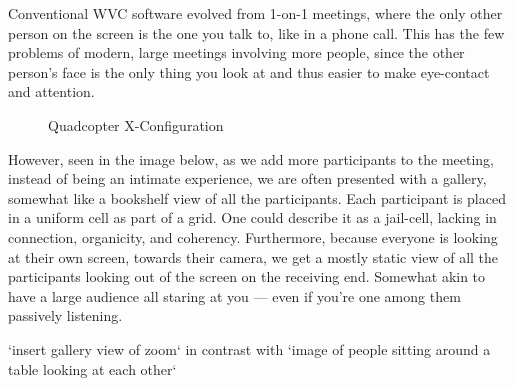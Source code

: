 \documentclass[11pt,letterpaper]{article}
\begin{document}
Conventional WVC software evolved from 1-on-1 meetings, where the only other person on the screen is the one you talk to, like in a phone call. This has the few problems of modern, large meetings involving more people, since the other person’s face is the only thing you look at and thus easier to make eye-contact and attention. 

\begin{figure}[H]
	\centering
	\caption{Quadcopter X-Configuration}
	\label{fig:test1}
\end{figure}

However, seen in the image below, as we add more participants to the meeting, instead of being an intimate experience, we are often presented with a gallery, somewhat like a bookshelf view of all the participants. Each participant is placed in a uniform cell as part of a grid. One could describe it as a jail-cell, lacking in connection, organicity, and coherency. Furthermore, because everyone is looking at their own screen, towards their camera, we get a mostly static view of all the participants looking out of the screen on the receiving end. Somewhat akin to have a large audience all staring at you --- even if you’re one among them passively listening.

`insert gallery view of zoom` in contrast with `image of people sitting around a table looking at each other`










\end{document}
